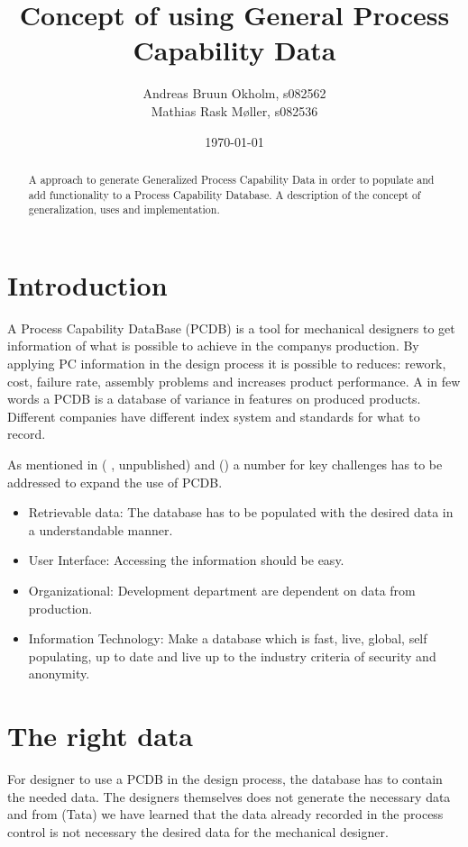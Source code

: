 \documentclass[aip,amsmath, reprint, author-year]{revtex4-1}
\begin{document}
\begin{abstract}
A approach to generate Generalized Process Capability Data in order to populate and add functionality to a Process Capability Database.
A description of the concept of generalization, uses and implementation.
\end{abstract}

\title{Concept of using General Process Capability Data}
\author{Andreas Bruun Okholm, s082562\\
Mathias Rask Møller, s082536 }
 
\date{\today}
\maketitle


\section{Introduction}

A Process Capability DataBase (PCDB)  is a tool for mechanical designers to get information of what is possible to achieve in the companys production. By applying PC information in the design process it is possible to reduces: rework, cost, failure rate, assembly problems and increases product performance.
A in few words a PCDB is a database of variance in features on produced products. Different companies have different index system and standards for what to record. 

As mentioned in (\cite{raskokholm} , unpublished) and (\cite{kern2003forecasting}) a number for key challenges has to be addressed to expand the use of PCDB.
\begin{itemize}
	\item Retrievable data: The database has to be populated with the desired data in a understandable manner.
	\item User Interface: Accessing the information should be easy.
	\item Organizational: Development department are dependent on data from production. 
	\item Information Technology: Make a database which is fast, live, global, self populating, up to date and live up to the industry criteria of security and anonymity.
\end{itemize}

\section{The right data}
For designer to use a PCDB in the design process, the database has to contain the needed data. The designers themselves does not generate the necessary data and from (Tata) we have learned that the data already recorded in the process control is not necessary the desired data for the mechanical designer. 
\end{document}
